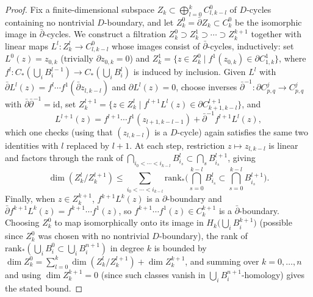 \begin{proof}
  Fix a finite-dimensional subspace $Z_k\subset\bigoplus_{l=0}^kC^0_{l,k-l}$ of
  $D$-cycles containing no nontrivial $D$-boundary, and let
  $Z_k^0=\bar\partial Z_k\subset C_k^0$ be the isomorphic image in
  $\bar\partial$-cycles. We construct a filtration
  $Z_k^0\supset Z_k^1\supset\cdots\supset Z_k^{k+1}$ together with linear maps
  $L^l:Z_k^l\to C^0_{l,k-l}$ whose images consist of $\bar\partial$-cycles,
  inductively: set $L^0(z)=z_{0,k}$ (trivially $\partial z_{0,k}=0$) and
  $Z_k^1=\{z\in Z_k^0\mid f^1(z_{0,k})\in\partial C^1_{1,k}\}$, where
  $f^l:C_*(\bigcup_iB_i^{l-1})\to C_*(\bigcup_iB_i^l)$ is induced by inclusion.
  Given $L^l$ with $\bar\partial L^l(z)=f^l\cdots f^1(\bar\partial z_{l,k-l})$
  and $\partial L^l(z)=0$, choose inverses
  $\bar\partial^{-1}:\partial C^j_{p,q}\to C^j_{p,q}$ with
  $\bar\partial\bar\partial^{-1}=\mathrm{id}$, set
  $Z_k^{l+1}=\{z\in Z_k^l\mid f^{l+1}L^l(z)\in\partial C^{l+1}_{k+1,k-l}\}$, and
  \[
    L^{l+1}(z)=f^{l+1}\cdots f^1(z_{l+1,k-l-1})+\bar\partial^{-1}f^{l+1}L^l(z),
  \]
  which one checks (using that $(z_{l,k-l})$ is a $D$-cycle) again satisfies the
  same two identities with $l$ replaced by $l+1$. At each step, restriction
  $z\mapsto z_{l,k-l}$ is linear and factors through the rank of
  $\bigcap_{i_0<\cdots<i_{k-l}}B_{i_s}^l\subset\bigcap_sB_{i_s}^{l+1}$, giving
  \[
    \dim(Z_k^l/Z_k^{l+1})\le\sum_{i_0<\cdots<i_{k-l}}
    \mathrm{rank}_*\Big(\bigcap_{s=0}^{k-l}B_{i_s}^l\subset\bigcap_{s=0}^{k-l}B_{i_s}^{l+1}\Big).
  \]
  Finally, when $z\in Z_k^{k+1}$, $f^{k+1}L^k(z)$ is a $\partial$-boundary and
  $\bar\partial f^{k+1}L^k(z)=f^{k+1}\cdots f^1(z)$, so
  $f^{k+1}\cdots f^1(z)\in C_k^{k+1}$ is a $\bar\partial$-boundary. Choosing
  $Z_k^0$ to map isomorphically onto its image in
  $H_k\big(\bigcup_iB_i^{k+1}\big)$ (possible since $Z_k^0$ was chosen with no
  nontrivial $D$-boundary), the rank of
  $\mathrm{rank}_*(\bigcup_iB_i^0\subset\bigcup_iB_i^{n+1})$ in degree $k$ is
  bounded by $\dim Z_k^0=\sum_{l=0}^k\dim(Z_k^l/Z_k^{l+1})+\dim Z_k^{k+1}$,
  and summing over $k=0,\dots,n$ and using $\dim Z_k^{k+1}=0$ (since such classes
  vanish in $\bigcup_iB_i^{n+1}$-homology) gives the stated bound.
\end{proof}

